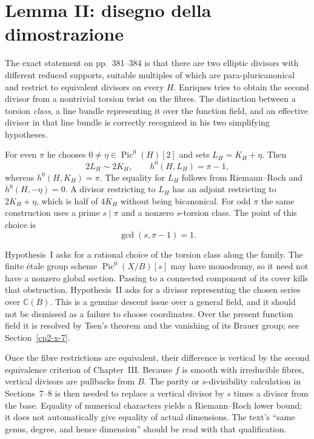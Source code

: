 \section{Lemma II: disegno della dimostrazione}
\label{cp2-x-6}

The exact statement on pp.~381--384 is that there are two elliptic divisors with different reduced supports, suitable multiples of which are para-pluricanonical and restrict to equivalent divisors on every $H$. Enriques tries to obtain the second divisor from a nontrivial torsion twist on the fibres. The distinction between a torsion \emph{class}, a line bundle representing it over the function field, and an effective divisor in that line bundle is correctly recognized in his two simplifying hypotheses.

For even $\pi$ he chooses $0\ne\eta\in\operatorname{Pic}^0(H)[2]$ and sets $L_H=K_H+\eta$. Then
\[
 2L_H\sim2K_H,\qquad
 h^0(H,L_H)=\pi-1,
\]
whereas $h^0(H,K_H)=\pi$. The equality for $L_H$ follows from Riemann--Roch and $h^0(H,-\eta)=0$. A divisor restricting to $L_H$ has an adjoint restricting to $2K_H+\eta$, which is half of $4K_H$ without being bicanonical. For odd $\pi$ the same construction uses a prime $s\mid\pi$ and a nonzero $s$-torsion class. The point of this choice is
\[
 \gcd(s,\pi-1)=1.
\]

Hypothesis~I asks for a rational choice of the torsion class along the family. The finite étale group scheme $\operatorname{Pic}^0(X/B)[s]$ may have monodromy, so it need not have a nonzero global section. Passing to a connected component of its cover kills that obstruction. Hypothesis~II asks for a divisor representing the chosen series over $\mathbb C(B)$. This is a genuine descent issue over a general field, and it should not be dismissed as a failure to choose coordinates. Over the present function field it is resolved by Tsen's theorem and the vanishing of its Brauer group; see Section~\ref{cp2-x-7}.

Once the fibre restrictions are equivalent, their difference is vertical by the second equivalence criterion of Chapter~III. Because $f$ is smooth with irreducible fibres, vertical divisors are pullbacks from $B$. The parity or $s$-divisibility calculation in Sections~7--8 is then needed to replace a vertical divisor by $s$ times a divisor from the base. Equality of numerical characters yields a Riemann--Roch lower bound; it does not automatically give equality of actual dimensions. The text's ``same genus, degree, and hence dimension'' should be read with that qualification.

